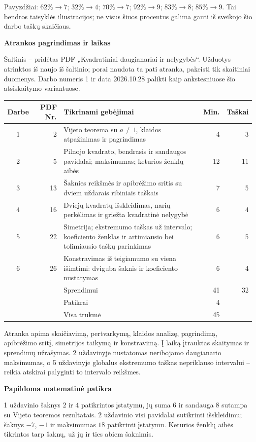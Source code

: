 \documentclass[11pt]{article}
\newcommand{\sk}[1]{\par\medskip\textbf{#1}\par}
\begin{document}
Pavyzdžiai: $62\%\to7$; $32\%\to4$; $70\%\to7$; $92\%\to9$; $83\%\to8$; $85\%\to9$. Tai bendros taisyklės iliustracijos; ne visus šiuos procentus galima gauti iš sveikojo šio darbo taškų skaičiaus.
\newpage

\sk{Atrankos pagrindimas ir laikas}
Šaltinis -- pridėtas PDF „Kvadratiniai daugianariai ir nelygybės“. Užduotys atrinktos iš naujo iš šaltinio; porai naudota ta pati atranka, pakeisti tik skaitiniai duomenys. Darbo numeris 1 ir data 2026.10.28 palikti kaip ankstesniuose šio atsiskaitymo variantuose.
\begin{center}\renewcommand{\arraystretch}{1.25}
\begin{tabularx}{\linewidth}{@{}crXrr@{}}\toprule
Darbe & PDF Nr. & Tikrinami gebėjimai & Min. & Taškai\\\midrule
1 & 2 & Vijeto teorema su $a\ne1$, klaidos atpažinimas ir pagrindimas & 4 & 3\\
2 & 5 & Pilnojo kvadrato, bendrasis ir sandaugos pavidalai; maksimumas; keturios ženklų aibės & 12 & 11\\
3 & 13 & Šaknies reikšmės ir apibrėžimo sritis su dviem uždarais ribiniais taškais & 7 & 5\\
4 & 16 & Dviejų kvadratų išskleidimas, narių perkėlimas ir griežta kvadratinė nelygybė & 6 & 4\\
5 & 22 & Simetrija; ekstremumo taškas už intervalo; koeficiento ženklas ir artimiausio bei tolimiausio taškų parinkimas & 6 & 5\\
6 & 26 & Konstravimas iš teigiamumo su viena išimtimi: dviguba šaknis ir koeficiento nustatymas & 6 & 4\\\midrule
 & & Sprendimui & 41 & 32\\
 & & Patikrai & 4 & \\
 & & Visa trukmė & 45 & \\\bottomrule
\end{tabularx}\end{center}
Atranka apima skaičiavimą, pertvarkymą, klaidos analizę, pagrindimą, apibrėžimo sritį, simetrijos taikymą ir konstravimą. Į laiką įtrauktas skaitymas ir sprendimų užrašymas. 2 uždavinyje nustatomas neribojamo daugianario maksimumas, o 5 uždavinyje globalus ekstremumo taškas nepriklauso intervalui -- reikia atskirai palyginti to intervalo reikšmes.

\sk{Papildoma matematinė patikra}
1 uždavinio šaknys $2$ ir $4$ patikrintos įstatymu, jų suma $6$ ir sandauga $8$ sutampa su Vijeto teoremos rezultatais. 2 uždavinio visi pavidalai sutikrinti išskleidimu; šaknys $-7$, $-1$ ir maksimumas $18$ patikrinti įstatymu. Keturios ženklų aibės tikrintos tarp šaknų, už jų ir ties abiem šaknimis.
\end{document}

